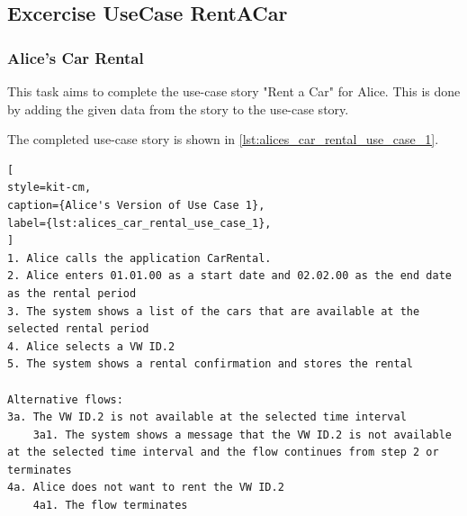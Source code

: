 \subsection{Excercise UseCase RentACar}
\label{sec:exercise_use_case_rent_a_car}
\subsubsection*{Alice's Car Rental}
This task aims to complete the use-case story "Rent a Car" for Alice.
This is done by adding the given data from the story to the use-case story.

The completed use-case story is shown in \autoref{lst:alices_car_rental_use_case_1}.

\begin{lstlisting}[
style=kit-cm,
caption={Alice's Version of Use Case 1},
label={lst:alices_car_rental_use_case_1},
]
1. Alice calls the application CarRental.
2. Alice enters 01.01.00 as a start date and 02.02.00 as the end date as the rental period
3. The system shows a list of the cars that are available at the selected rental period
4. Alice selects a VW ID.2
5. The system shows a rental confirmation and stores the rental

Alternative flows:
3a. The VW ID.2 is not available at the selected time interval
    3a1. The system shows a message that the VW ID.2 is not available at the selected time interval and the flow continues from step 2 or terminates
4a. Alice does not want to rent the VW ID.2
    4a1. The flow terminates
\end{lstlisting}
